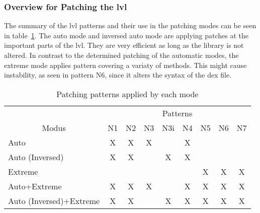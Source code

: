 \subsubsection{Overview for Patching the \gls{lvl}}
The summary of the \gls{lvl} patterns and their use in the patching modes can be seen in table~\ref{table:patterns}.
The auto mode and inversed auto mode are applying patches at the important parts of the \gls{lvl}.
They are very efficient as long as the library is not altered.
In contrast to the determined patching of the automatic modes, the extreme mode applies pattern covering a variaty of methods.
This might cause instability, as seen in pattern N6, since it alters the syntax of the dex file.
\begin{table}[h]
\centering
\begin{tabular}{l|cccccccc}
                           & \multicolumn{8}{c}{Patterns}           \\
\multicolumn{1}{c|}{Modus} & N1 & N2 & N3 & N3i & N4 & N5 & N6 & N7 \\ \hline
Auto                       & X  & X  & X  &     & X  &    &    &    \\
Auto (Inversed)            & X  & X  &    & X   & X  &    &    &    \\
Extreme                    &    &    &    &     &    & X  & X  & X  \\
Auto+Extreme               & X  & X  & X  &     & X  & X  & X  & X  \\
Auto (Inversed)+Extreme    & X  & X  &    & X   & X  & X  & X  & X
\end{tabular}
\caption{Patching patterns applied by each mode}
\label{table:patterns}
\end{table}


